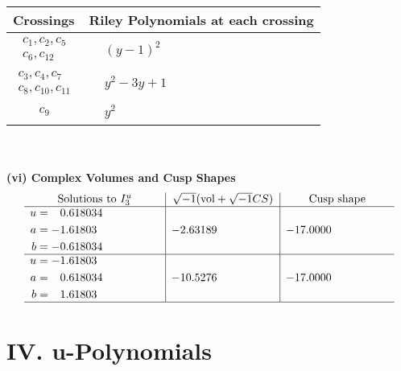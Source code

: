 \documentclass[1p]{elsarticle_modified}
\theoremstyle{definition}
\newcommand{\I}{\sqrt{-1}}
\begin{document}
\begin{tabular}{m{50pt}|m{274pt}}
Crossings & \hspace{64pt}Riley Polynomials at each crossing \\
\hline $$\begin{aligned}c_{1},c_{2},c_{5}\\c_{6},c_{12}\end{aligned}$$&$\begin{aligned}
&(y-1)^2
\end{aligned}$\\
\hline $$\begin{aligned}c_{3},c_{4},c_{7}\\c_{8},c_{10},c_{11}\end{aligned}$$&$\begin{aligned}
&y^2-3 y+1
\end{aligned}$\\
\hline $$\begin{aligned}c_{9}\end{aligned}$$&$\begin{aligned}
&y^2
\end{aligned}$\\
\hline
\end{tabular}\\~\\
\newpage\flushleft \textbf{(vi) Complex Volumes and Cusp Shapes}
$$\begin{array}{c|c|c}  
\text{Solutions to }I^u_{3}& \I (\text{vol} + \sqrt{-1}CS) & \text{Cusp shape}\\
 \hline 
\begin{aligned}
u &= \phantom{-}0.618034\phantom{ +0.000000I} \\
a &= -1.61803\phantom{ +0.000000I} \\
b &= -0.618034\phantom{ +0.000000I}\end{aligned}
 & -2.63189\phantom{ +0.000000I} & -17.0000\phantom{ +0.000000I} \\ \hline\begin{aligned}
u &= -1.61803\phantom{ +0.000000I} \\
a &= \phantom{-}0.618034\phantom{ +0.000000I} \\
b &= \phantom{-}1.61803\phantom{ +0.000000I}\end{aligned}
 & -10.5276\phantom{ +0.000000I} & -17.0000\phantom{ +0.000000I}\\
 \hline 
 \end{array}$$\newpage
\newpage\renewcommand{\arraystretch}{1}
\centering \section*{ IV. u-Polynomials}
\end{document}
